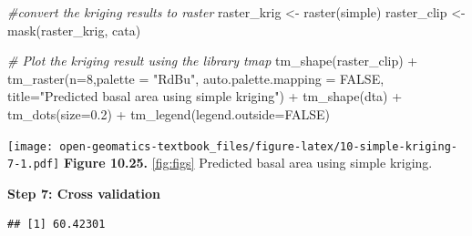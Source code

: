 \documentclass[
]{book}
\newenvironment{Shaded}{\begin{snugshade}}{\end{snugshade}}
\newcommand{\AttributeTok}[1]{\textcolor[rgb]{0.77,0.63,0.00}{#1}}
\newcommand{\CommentTok}[1]{\textcolor[rgb]{0.56,0.35,0.01}{\textit{#1}}}
\newcommand{\ConstantTok}[1]{\textcolor[rgb]{0.00,0.00,0.00}{#1}}
\newcommand{\DecValTok}[1]{\textcolor[rgb]{0.00,0.00,0.81}{#1}}
\newcommand{\DocumentationTok}[1]{\textcolor[rgb]{0.56,0.35,0.01}{\textbf{\textit{#1}}}}
\newcommand{\FloatTok}[1]{\textcolor[rgb]{0.00,0.00,0.81}{#1}}
\newcommand{\FunctionTok}[1]{\textcolor[rgb]{0.00,0.00,0.00}{#1}}
\newcommand{\NormalTok}[1]{#1}
\newcommand{\OtherTok}[1]{\textcolor[rgb]{0.56,0.35,0.01}{#1}}
\newcommand{\SpecialCharTok}[1]{\textcolor[rgb]{0.00,0.00,0.00}{#1}}
\newcommand{\StringTok}[1]{\textcolor[rgb]{0.31,0.60,0.02}{#1}}
\begin{document}
\begin{Shaded}
\begin{Highlighting}[]
\CommentTok{\#convert the kriging results to raster}
\NormalTok{raster\_krig      }\OtherTok{\textless{}{-}} \FunctionTok{raster}\NormalTok{(simple)}
\NormalTok{raster\_clip    }\OtherTok{\textless{}{-}} \FunctionTok{mask}\NormalTok{(raster\_krig, cata)}

\CommentTok{\# Plot the kriging result using the library tmap}
\FunctionTok{tm\_shape}\NormalTok{(raster\_clip) }\SpecialCharTok{+} 
  \FunctionTok{tm\_raster}\NormalTok{(}\AttributeTok{n=}\DecValTok{8}\NormalTok{,}\AttributeTok{palette =} \StringTok{"RdBu"}\NormalTok{, }\AttributeTok{auto.palette.mapping =} \ConstantTok{FALSE}\NormalTok{,}
            \AttributeTok{title=}\StringTok{"Predicted basal area using simple kriging"}\NormalTok{) }\SpecialCharTok{+} 
  \FunctionTok{tm\_shape}\NormalTok{(dta) }\SpecialCharTok{+} \FunctionTok{tm\_dots}\NormalTok{(}\AttributeTok{size=}\FloatTok{0.2}\NormalTok{) }\SpecialCharTok{+}
  \FunctionTok{tm\_legend}\NormalTok{(}\AttributeTok{legend.outside=}\ConstantTok{FALSE}\NormalTok{)}
\end{Highlighting}
\end{Shaded}

\texttt{[image: open-geomatics-textbook\_files/figure-latex/10-simple-kriging-7-1.pdf]}
\textbf{Figure 10.25.} \ref{fig:figs} Predicted basal area using simple kriging.

\textbf{Step 7: Cross validation}

\begin{Shaded}
\end{Shaded}

\begin{verbatim}
## [1] 60.42301
\end{verbatim}
\end{document}
